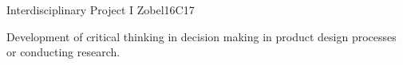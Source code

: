 \begin{syllabus}
\begin{unit}{Interdisciplinary Project I }{}{Zobel}{16}{C17}
\begin{learningoutcomes}
   \item Development of critical thinking in decision making in product design processes or conducting research.
\end{learningoutcomes}
\end{unit}

\begin{coursebibliography}
\end{coursebibliography}

\end{syllabus}
